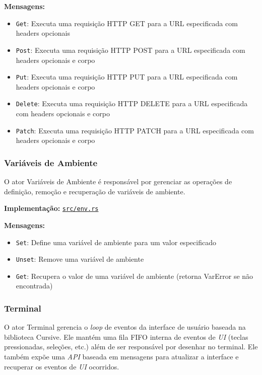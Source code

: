 \textbf{Mensagens:}

\begin{itemize}
    \item \texttt{Get}: Executa uma requisição HTTP GET para a URL especificada com headers opcionais
    \item \texttt{Post}: Executa uma requisição HTTP POST para a URL especificada com headers opcionais e corpo
    \item \texttt{Put}: Executa uma requisição HTTP PUT para a URL especificada com headers opcionais e corpo
    \item \texttt{Delete}: Executa uma requisição HTTP DELETE para a URL especificada com headers opcionais e corpo
    \item \texttt{Patch}: Executa uma requisição HTTP PATCH para a URL especificada com headers opcionais e corpo
\end{itemize}

\subsubsection{Variáveis de Ambiente}

O ator Variáveis de Ambiente é responsável por gerenciar as operações de definição, remoção e recuperação de variáveis de ambiente.

\textbf{Implementação:} \href{https://github.com/nahharris/ph-actors-tcc/blob/master/src/env.rs}{\texttt{src/env.rs}}

\textbf{Mensagens:}

\begin{itemize}
    \item \texttt{Set}: Define uma variável de ambiente para um valor especificado
    \item \texttt{Unset}: Remove uma variável de ambiente
    \item \texttt{Get}: Recupera o valor de uma variável de ambiente (retorna VarError se não encontrada)
\end{itemize}

\subsubsection{Terminal}

O ator Terminal gerencia o \emph{loop} de eventos da interface de usuário baseada na biblioteca Cursive. Ele mantém uma fila FIFO interna de eventos de \emph{UI} (teclas pressionadas, seleções, etc.) além de ser responsável por desenhar no terminal. Ele também expõe uma \emph{API} baseada em mensagens para atualizar a interface e recuperar os eventos de \emph{UI} ocorridos.


